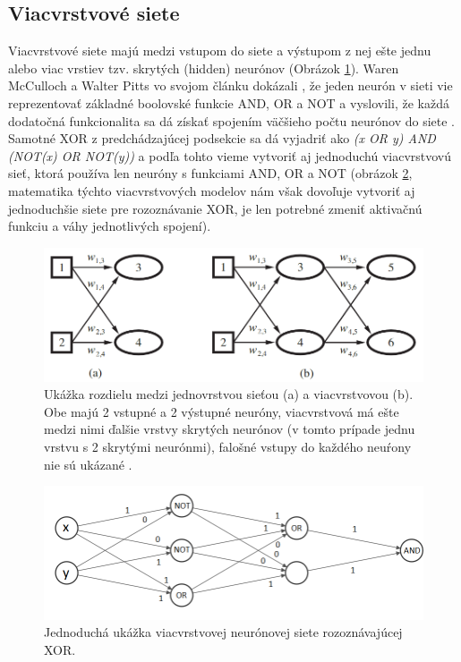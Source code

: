 \subsection{Viacvrstvové siete}
Viacvrstvové siete majú medzi vstupom do siete a výstupom z nej ešte jednu alebo viac vrstiev tzv. skrytých (hidden) neurónov (Obrázok \ref{img:single}).
Waren McCulloch a Walter Pitts vo svojom článku dokázali \citep{multi}, že jeden neurón v sieti vie reprezentovať základné boolovské funkcie AND, OR a NOT a vyslovili, že každá dodatočná funkcionalita sa dá získať spojením väčšieho počtu neurónov do siete . Samotné XOR z predchádzajúcej podsekcie sa dá vyjadriť ako 
\textit{(x OR y) AND (NOT(x) OR NOT(y))} a podľa tohto vieme vytvoriť aj jednoduchú viacvrstvovú sieť, ktorá používa len neuróny s funkciami AND, OR a NOT (obrázok \ref{img:xor}, matematika týchto viacvrstvových modelov nám však dovoľuje vytvoriť aj jednoduchšie siete pre rozoznávanie XOR, je len potrebné zmeniť aktivačnú funkciu a váhy jednotlivých spojení).

\begin{figure} 
\includegraphics[width=\textwidth]{../img/nn_aima_single_multi.png}
\caption{Ukážka rozdielu medzi jednovrstvou sieťou (a) a viacvrstvovou (b). Obe majú 2 vstupné a 2 výstupné neuróny, viacvrstvová má ešte medzi nimi ďalšie vrstvy skrytých neurónov (v tomto prípade jednu vrstvu s 2 skrytými neurónmi), falošné vstupy do každého neuŕony nie sú ukázané \citep{aima}.}
\label{img:single}
\end{figure}

\begin{figure} 
\includegraphics[width=\textwidth]{../img/xor.png}
\caption{Jednoduchá ukážka viacvrstvovej neurónovej siete rozoznávajúcej XOR.}
\label{img:xor}
\end{figure}


